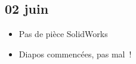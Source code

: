 \documentclass[a4paper, 11pt, final, garamond]{book}
\begin{document}
\subsection{02 juin}
\begin{itemize}
  \item Pas de pièce SolidWorks
  \item Diapos commencées, pas mal~!
\end{itemize}

% 
% 
% 
% 
\end{document}
